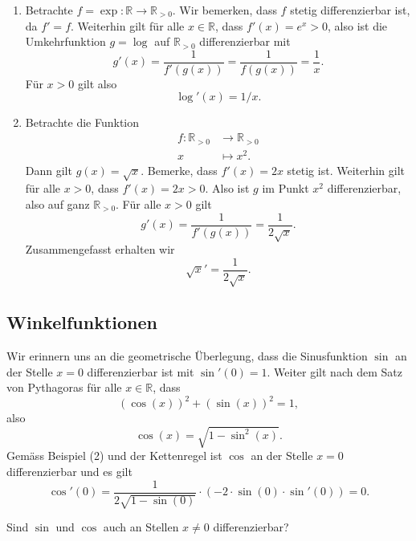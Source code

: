 \documentclass[../main.tex]{subfiles}
\begin{document}
\begin{examples}
  \leavevmode
  \begin{enumerate}[(1)]
    \item Betrachte $f = \exp \colon \mathbb{R} \to \mathbb{R}_{>0}$.
      Wir bemerken, dass $f$ stetig differenzierbar ist, da $f' = f$.
      Weiterhin gilt für alle $x \in \mathbb{R}$, dass
      $f'(x) = e^x > 0$, also ist die Umkehrfunktion $g = \log$
      auf $\mathbb{R}_{>0}$ differenzierbar mit
      \[
        g'(x) = \frac{1}{f'(g(x))} = \frac{1}{f(g(x))} = \frac{1}{x}.
      \]
      Für $x > 0$ gilt also
       \[
         \log'(x) = 1 / x.
      \]
    \item Betrachte die Funktion
      \begin{align*}
        f \colon \mathbb{R}_{> 0} & \to \mathbb{R}_{> 0} \\
        x & \mapsto x^2.
      \end{align*}
      Dann gilt $g(x) = \sqrt x$. Bemerke, dass
      $f'(x) = 2x$ stetig ist.
      Weiterhin gilt für alle $x > 0$, dass $f'(x) = 2 x > 0$.
      Also ist $g$ im Punkt $x^2$ differenzierbar,
      also auf ganz $\mathbb{R}_{>0}$. Für alle
      $x > 0$ gilt
      \[
        g'(x) = \frac{1}{f'(g(x))} = \frac{1}{2 \sqrt x}.
      \]
      Zusammengefasst erhalten wir
      \[
        \sqrt x ' = \frac{1}{2\sqrt x}.
      \]
  \end{enumerate}
\end{examples}

\subsection*{Winkelfunktionen}
Wir erinnern uns an die geometrische Überlegung, dass
die Sinusfunktion
$\sin$
an der Stelle $x = 0$ differenzierbar ist mit
$\sin'(0) = 1$. Weiter gilt nach dem Satz
von Pythagoras für alle $x \in \mathbb{R}$,
dass
\[
  {(\cos(x))}^2 + {(\sin(x))}^2 = 1,
\]
also
\[
  \cos(x) = \sqrt{1 - \sin^2(x)}.
\]
Gemäss Beispiel (2) und der
Kettenregel ist $\cos$ an der
Stelle $x = 0$ differenzierbar
und es gilt
\[
  \cos ' ( 0 ) =
  \frac{1}{2 \sqrt{1 - \sin(0)}} \cdot (-2 \cdot \sin(0) \cdot \sin'(0)) = 0.
\]

\begin{question}
  Sind $\sin$ und $\cos$ auch an Stellen $x \neq 0$
  differenzierbar?
\end{question}
\end{document}
